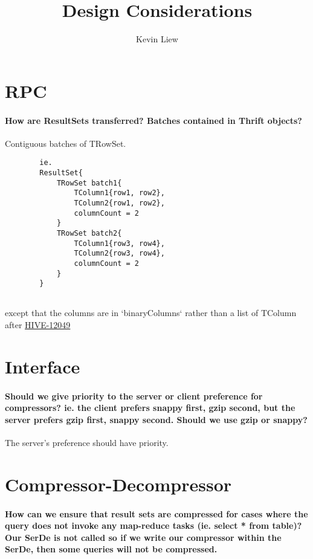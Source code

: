 \documentclass[11pt,a4paper]{article}
\title{Design Considerations}
\author{Kevin Liew}
\begin{document}
\maketitle

\section{RPC}
	
	\paragraph{How are ResultSets transferred? Batches contained in Thrift objects?}
	Contiguous batches of TRowSet.
	\begin{verbatim}
		ie.
		ResultSet{
		    TRowSet batch1{
		        TColumn1{row1, row2},
		        TColumn2{row1, row2},
		        columnCount = 2
		    }
		    TRowSet batch2{
		        TColumn1{row3, row4},
		        TColumn2{row3, row4},
		        columnCount = 2
		    }
		}
		
	\end{verbatim}
	except that the columns are in `binaryColumns` rather than a list of TColumn after \href{https://issues.apache.org/jira/browse/HIVE-12049}{HIVE-12049}

\section{Interface}
	
	\paragraph{Should we give priority to the server or client preference for compressors? ie. the client prefers snappy first, gzip second, but the server prefers gzip first, snappy second. Should we use gzip or snappy?}
	The server's preference should have priority.

\section{Compressor-Decompressor}
	
	\paragraph{How can we ensure that result sets are compressed for cases where the query does not invoke any map-reduce tasks (ie. select * from table)? Our SerDe is not called so if we write our compressor within the SerDe, then some queries will not be compressed.}
	
\end{document}
